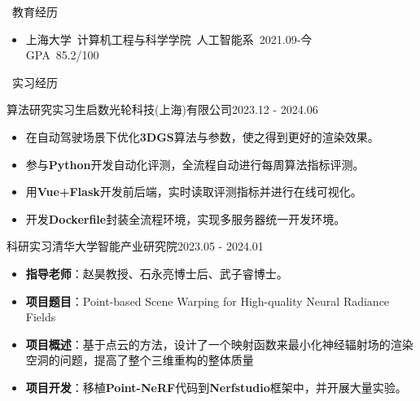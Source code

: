 \documentclass[UTF8]{resume}
\begin{document}
\begin{rSection}{\faGraduationCap~教育经历}
    \begin{itemize}
        \item 上海大学~计算机工程与科学学院~人工智能系~\hfill 2021.09-今 \\ GPA~85.2/100
    \end{itemize}
\end{rSection}
 
\begin{rSection}{\faBriefcase~实习经历}
    \begin{rExperience}{算法研究实习生}{启数光轮科技(上海)有限公司}{2023.12 - 2024.06}
        \begin{itemize}
            \itemsep -0.5em \vspace{-0.5em}
            \item 在自动驾驶场景下优化\textbf{3DGS}算法与参数，使之得到更好的渲染效果。
            \item 参与\textbf{Python}开发自动化评测，全流程自动进行每周算法指标评测。
            \item 用\textbf{Vue+Flask}开发前后端，实时读取评测指标并进行在线可视化。
            \item 开发\textbf{Dockerfile}封装全流程环境，实现多服务器统一开发环境。
        \end{itemize}
    \end{rExperience}

    \begin{rExperience}{科研实习}{清华大学智能产业研究院}{2023.05 - 2024.01}
        \begin{itemize}
            \itemsep -0.5em \vspace{-0.5em}
            \item \textbf{指导老师}：赵昊教授、石永亮博士后、武子睿博士。
            \item \textbf{项目题目}：Point-based Scene Warping for High-quality Neural Radiance Fields
            \item \textbf{项目概述}：基于点云的方法，设计了一个映射函数来最小化神经辐射场的渲染空洞的问题，提高了整个三维重构的整体质量
            \item \textbf{项目开发}：移植\textbf{Point-NeRF}代码到\textbf{Nerfstudio}框架中，并开展大量实验。
        \end{itemize}
    \end{rExperience}
\end{rSection}
\end{document}
